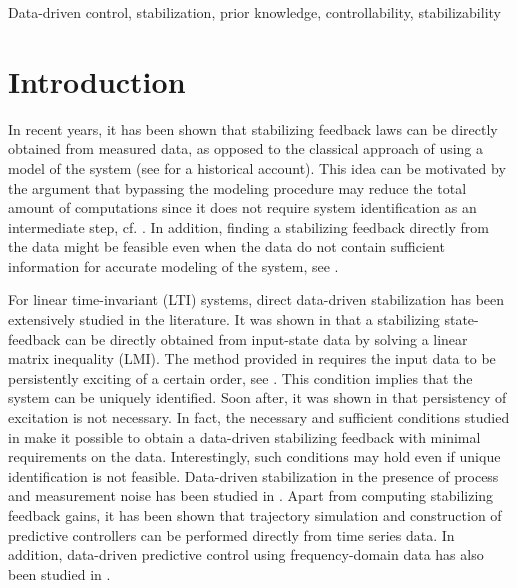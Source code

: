 \documentclass[9pt,shortpaper,twoside,web]{ieeecolor}
\begin{document}
\begin{IEEEkeywords}
Data-driven control, stabilization, prior knowledge, controllability, stabilizability
\end{IEEEkeywords}

\section{Introduction}
\label{sec:introduction}

In recent years, it has been shown that stabilizing feedback laws can be directly obtained from measured data, as opposed to the classical approach of using a model of the system (see \cite[Ch. 1.2]{DBLSCT2025} for a historical account). This idea can be motivated by the argument that bypassing the modeling procedure may reduce the total amount of computations since it does not require system identification as an intermediate step, cf. \cite{dorfler2022bridging}. In addition, finding a stabilizing feedback directly from the data might be feasible even when the data do not contain sufficient information for accurate modeling of the system, see \cite[Ex. 19]{van2020data}. 

For linear time-invariant (LTI) systems, direct data-driven stabilization has been extensively studied in the literature. It was shown in \cite{de2019formulas} that a stabilizing state-feedback can be directly obtained from input-state data by solving a linear matrix inequality (LMI). The method provided in \cite{de2019formulas} requires the input data to be persistently exciting of a certain order, see \cite[p. 327]{Willems2005}. This condition implies that the system can be uniquely identified. Soon after, it was shown in \cite{van2020data} that persistency of excitation is not necessary. In fact, the necessary and sufficient conditions studied in \cite{van2020data} make it possible to obtain a data-driven stabilizing feedback with minimal requirements on the data. Interestingly, such conditions may hold even if unique identification is not feasible. Data-driven stabilization in the presence of process and measurement noise has been studied in \cite{van2020noisy,kaminaga2025data,li2026controller}. Apart from computing stabilizing feedback gains, it has been shown that trajectory simulation \cite{markovsky2008data} and construction of predictive controllers \cite{coulson2019data,berberich2020data} can be performed directly from time series data. In addition, data-driven predictive control using frequency-domain data has also been studied in \cite{MeiNou_NMPC24a}.
\end{document}
